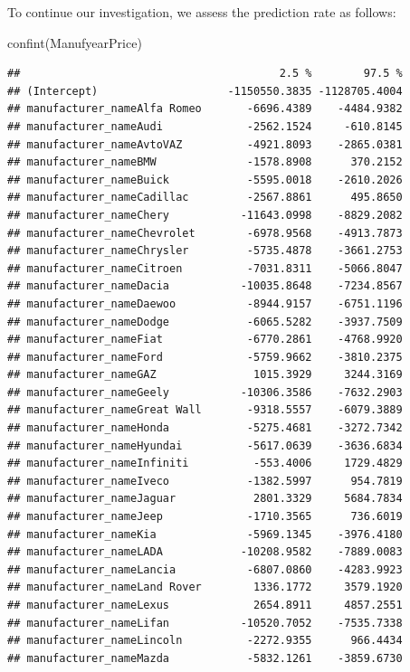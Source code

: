 \documentclass[
]{article}
\newenvironment{Shaded}{\begin{snugshade}}{\end{snugshade}}
\newcommand{\FunctionTok}[1]{\textcolor[rgb]{0.00,0.00,0.00}{#1}}
\newcommand{\NormalTok}[1]{#1}
\begin{document}
To continue our investigation, we assess the prediction rate as follows:

\begin{Shaded}
\begin{Highlighting}[]
\FunctionTok{confint}\NormalTok{(ManufyearPrice)}
\end{Highlighting}
\end{Shaded}

\begin{verbatim}
##                                        2.5 %        97.5 %
## (Intercept)                    -1150550.3835 -1128705.4004
## manufacturer_nameAlfa Romeo       -6696.4389    -4484.9382
## manufacturer_nameAudi             -2562.1524     -610.8145
## manufacturer_nameAvtoVAZ          -4921.8093    -2865.0381
## manufacturer_nameBMW              -1578.8908      370.2152
## manufacturer_nameBuick            -5595.0018    -2610.2026
## manufacturer_nameCadillac         -2567.8861      495.8650
## manufacturer_nameChery           -11643.0998    -8829.2082
## manufacturer_nameChevrolet        -6978.9568    -4913.7873
## manufacturer_nameChrysler         -5735.4878    -3661.2753
## manufacturer_nameCitroen          -7031.8311    -5066.8047
## manufacturer_nameDacia           -10035.8648    -7234.8567
## manufacturer_nameDaewoo           -8944.9157    -6751.1196
## manufacturer_nameDodge            -6065.5282    -3937.7509
## manufacturer_nameFiat             -6770.2861    -4768.9920
## manufacturer_nameFord             -5759.9662    -3810.2375
## manufacturer_nameGAZ               1015.3929     3244.3169
## manufacturer_nameGeely           -10306.3586    -7632.2903
## manufacturer_nameGreat Wall       -9318.5557    -6079.3889
## manufacturer_nameHonda            -5275.4681    -3272.7342
## manufacturer_nameHyundai          -5617.0639    -3636.6834
## manufacturer_nameInfiniti          -553.4006     1729.4829
## manufacturer_nameIveco            -1382.5997      954.7819
## manufacturer_nameJaguar            2801.3329     5684.7834
## manufacturer_nameJeep             -1710.3565      736.6019
## manufacturer_nameKia              -5969.1345    -3976.4180
## manufacturer_nameLADA            -10208.9582    -7889.0083
## manufacturer_nameLancia           -6807.0860    -4283.9923
## manufacturer_nameLand Rover        1336.1772     3579.1920
## manufacturer_nameLexus             2654.8911     4857.2551
## manufacturer_nameLifan           -10520.7052    -7535.7338
## manufacturer_nameLincoln          -2272.9355      966.4434
## manufacturer_nameMazda            -5832.1261    -3859.6730

\end{verbatim}
\end{document}

